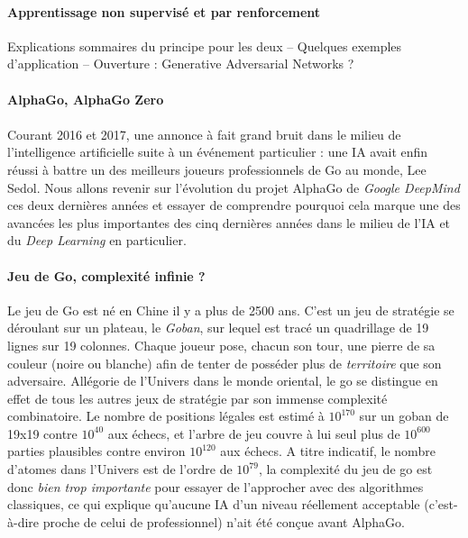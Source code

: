 \paragraph{Apprentissage non supervisé et par renforcement} Explications sommaires du principe pour les deux --
Quelques exemples d'application -- Ouverture : Generative Adversarial Networks ?

\paragraph{AlphaGo, AlphaGo Zero}

\paragraph{} Courant 2016 et 2017, une annonce à fait grand bruit dans le milieu de l'intelligence artificielle
suite à un événement particulier : une IA avait enfin réussi à battre un des meilleurs joueurs professionnels de Go
au monde, Lee Sedol. Nous allons revenir sur l'évolution du projet AlphaGo de \emph{Google DeepMind} ces deux dernières
années et essayer de comprendre pourquoi cela marque une des avancées les plus importantes des cinq dernières années
dans le milieu de l'IA et du \emph{Deep Learning} en particulier.

\paragraph{Jeu de Go, complexité infinie ?} Le jeu de Go est né en Chine il y a plus de 2500 ans. C'est un jeu de stratégie
se déroulant sur un plateau, le \emph{Goban}, sur lequel est tracé un quadrillage de 19 lignes sur 19 colonnes. Chaque joueur
pose, chacun son tour, une pierre de sa couleur (noire ou blanche) afin de tenter de posséder plus de \emph{territoire} que
son adversaire. Allégorie de l'Univers dans le monde oriental, le go se distingue en effet de tous les autres jeux de stratégie
par son immense complexité combinatoire. Le nombre de positions légales est estimé à \begin{math}10^{170}\end{math} sur un goban
de 19x19 contre \begin{math}10^{40}\end{math} aux échecs, et l'arbre de jeu couvre à lui seul plus de \begin{math}10^{600}\end{math}
parties plausibles contre environ \begin{math}10^{120}\end{math} aux échecs. A titre indicatif, le nombre d'atomes dans l'Univers est
de l'ordre de \begin{math}10^{79}\end{math}, la complexité du jeu de go est donc \emph{bien trop importante} pour essayer de l'approcher
avec des algorithmes classiques, ce qui explique qu'aucune IA d'un niveau réellement acceptable (c'est-à-dire proche de celui de
professionnel) n'ait été conçue avant AlphaGo.

